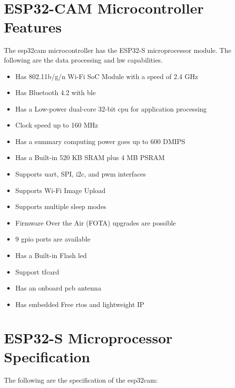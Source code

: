 
\section{ESP32-CAM Microcontroller Features}\label{ESP32specifications}

The \ac{esp32cam} microcontroller has the ESP32-S microprocessor module. The following are the data processing and \ac{hw} capabilities.

\begin{itemize}
    \item Has 802.11b/g/n Wi-Fi SoC Module with a speed of 2.4 GHz
    \item Has Bluetooth 4.2 with \ac{ble}
    \item Has a Low-power dual-core 32-bit \ac{cpu} for application processing
    \item Clock speed up to 160 MHz
    \item Has a summary computing power goes up to 600 DMIPS
    \item Has a Built-in 520 KB SRAM plus 4 MB PSRAM
    \item Supports \ac{uart}, SPI, \ac{i2c}, and \ac{pwm} interfaces
    \item Supports Wi-Fi Image Upload
    \item Supports multiple sleep modes
    \item Firmware Over the Air (FOTA) upgrades are possible
    \item 9 \ac{gpio} ports are available
    \item Has a Built-in Flash \ac{led}
    \item Support \ac{tfcard}
    \item Has an onboard \ac{pcb} antenna
    \item Has embedded Free \ac{rtos} and lightweight IP
\end{itemize}


\section{ESP32-S Microprocessor Specification}

The following are the specification of the \ac{esp32cam}:

